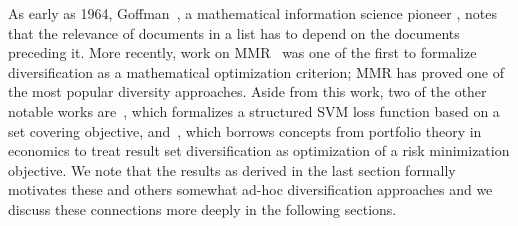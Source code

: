 As early as 1964, Goffman~\cite{goffman64OnRelevanceAsAMeasure}, a
mathematical information science pioneer \cite{harmon08RememberingWG},
notes that the relevance of documents in a list has to depend on the
documents preceding it.  More recently, work on
MMR~\cite{carbonell98MMR} was one of the first to formalize
diversification as a mathematical optimization criterion; MMR has
proved one of the most popular diversity approaches.  Aside from this
work, two of the other notable works are~\cite{yue081224Predicting},
which formalizes a structured SVM loss function based on a set
covering objective, and~\cite{wang09PortfolioTheory}, which borrows
concepts from portfolio theory in economics to treat result set
diversification as optimization of a risk minimization objective.  We
note that the results as derived in the last section formally motivates these and others somewhat ad-hoc diversification approaches and we discuss
these connections more deeply in the following sections.

